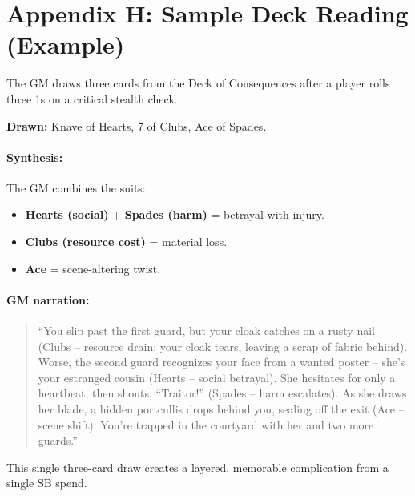 \clearpage
\section*{Appendix H: Sample Deck Reading (Example)}
\label{app:sample-reading}

The GM draws three cards from the Deck of Consequences after a player rolls three 1s on a critical stealth check.

\textbf{Drawn:} Knave of Hearts, 7 of Clubs, Ace of Spades.

\paragraph{Synthesis:} The GM combines the suits:
\begin{itemize}
  \item \textbf{Hearts (social)} + \textbf{Spades (harm)} = betrayal with injury.
  \item \textbf{Clubs (resource cost)} = material loss.
  \item \textbf{Ace} = scene-altering twist.
\end{itemize}

\paragraph{GM narration:}
\begin{quote}
``You slip past the first guard, but your cloak catches on a rusty nail (Clubs -- resource drain: your cloak tears, leaving a scrap of fabric behind). Worse, the second guard recognizes your face from a wanted poster -- she's your estranged cousin (Hearts -- social betrayal). She hesitates for only a heartbeat, then shouts, ``Traitor!'' (Spades -- harm escalates). As she draws her blade, a hidden portcullis drops behind you, sealing off the exit (Ace -- scene shift). You're trapped in the courtyard with her and two more guards.''
\end{quote}

\noindent This single three-card draw creates a layered, memorable complication from a single SB spend.
